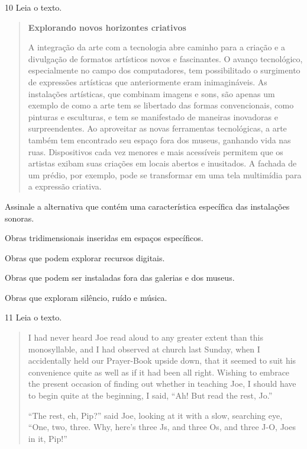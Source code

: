 \num{10} Leia o texto.

\begin{quote}
\textbf{Explorando novos horizontes criativos}

A integração da arte com a tecnologia abre caminho para a criação e a divulgação de formatos artísticos 
novos e fascinantes. O avanço tecnológico, especialmente no campo dos computadores, tem possibilitado o 
surgimento de expressões artísticas que anteriormente eram inimagináveis. As instalações artísticas, que 
combinam imagens e sons, são apenas um exemplo de como a arte tem se libertado das formas convencionais, 
como pinturas e esculturas, e tem se manifestado de maneiras inovadoras e surpreendentes. Ao aproveitar as 
novas ferramentas tecnológicas, a arte também tem encontrado seu espaço fora dos museus, ganhando vida nas 
ruas. Dispositivos cada vez menores e mais acessíveis permitem que os artistas exibam suas criações em 
locais abertos e inusitados. A fachada de um prédio, por exemplo, pode se transformar em uma tela 
multimídia para a expressão criativa.

\end{quote}

Assinale a alternativa que contém uma característica específica das
instalações sonoras.

\begin{escolha}
\item
  Obras tridimensionais inseridas em espaços específicos.
\item
  Obras que podem explorar recursos digitais.
\item
  Obras que podem ser instaladas fora das galerias e dos museus.
\item
  Obras que exploram silêncio, ruído e música.
\end{escolha}

\num{11} Leia o texto.

\begin{quote}
I had never heard Joe read aloud to any greater extent than this
monosyllable, and I had observed at church last Sunday, when I
accidentally held our Prayer-Book upside down, that it seemed to suit
his convenience quite as well as if it had been all right. Wishing to
embrace the present occasion of finding out whether in teaching Joe, I
should have to begin quite at the beginning, I said, ``Ah! But read the
rest, Jo.''

``The rest, eh, Pip?'' said Joe, looking at it with a slow, searching
eye, ``One, two, three. Why, here's three Js, and three Os, and three
J-O, Joes in it, Pip!''

\end{quote}


